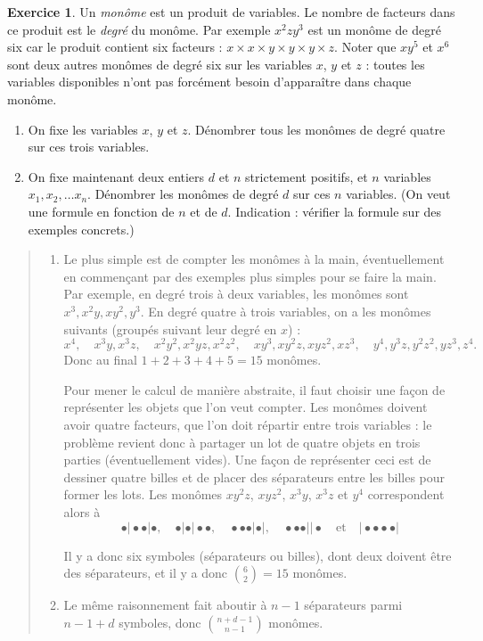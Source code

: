 \documentclass[11pt]{article}
\theoremstyle{definition}
\newtheorem{exo}{Exercice}
\newenvironment{solution}{\begin{quote}\color{teal}}{\end{quote}}
\begin{document}
\begin{exo}
Un \emph{monôme} est un produit de variables. Le nombre de facteurs dans ce produit est le \emph{degré} du monôme.
Par exemple $x^2zy^3$ est un monôme de degré six car le produit contient six facteurs : $x\times x\times y\times y\times y \times z$. Noter que $xy^5$ et $x^6$ sont deux autres monômes de degré six sur les variables $x$, $y$ et $z$ : toutes les variables disponibles n'ont pas forcément besoin d'apparaître dans chaque monôme.
\begin{enumerate}
\item On fixe les variables $x$, $y$ et $z$. Dénombrer tous les monômes de degré quatre sur ces trois variables.
\item On fixe maintenant deux entiers $d$ et $n$ strictement positifs, et $n$ variables $x_1, x_2, \dots x_n$. Dénombrer les monômes de degré $d$ sur ces $n$ variables. (On veut une formule en fonction de $n$ et de $d$. Indication : vérifier la formule sur des exemples concrets.)
\end{enumerate}

\begin{solution}
\begin{enumerate}
\item Le plus simple est de compter les monômes à la main, éventuellement en commençant par des exemples plus simples pour se faire la main. Par exemple, en degré trois à deux variables, les monômes sont $x^3, x^2y, xy^2, y^3$. En degré quatre à trois variables, on a les monômes suivants (groupés suivant leur degré en $x$) :
\[
x^4,\quad x^3y, x^3z, \quad
x^2y^2, x^2yz, x^2z^2,\quad
xy^3, xy^2z,xyz^2,xz^3,\quad
y^4,y^3z,y^2z^2,yz^3,z^4.
\]
Donc au final $1+2+3+4+5=15$ monômes.

Pour mener le calcul de manière abstraite, il faut choisir une façon de représenter les objets que l'on veut compter. Les monômes doivent avoir quatre facteurs, que l'on doit répartir entre trois variables : le problème revient donc à partager un lot de quatre objets en trois parties (éventuellement vides). Une façon de représenter ceci est de dessiner quatre billes et de placer des séparateurs entre les billes pour former les lots. Les monômes $xy^2z$, $xyz^2$, $x^3y$, $x^3z$ et $y^4$ correspondent alors à
\[ \bullet \vert \bullet \bullet \vert \bullet,\quad
\bullet \vert \bullet \vert \bullet \bullet, \quad 
\bullet \bullet \bullet \vert\bullet\vert, \quad 
\bullet \bullet \bullet \vert \vert \bullet \quad\text{et}\quad 
\vert\bullet \bullet \bullet  \bullet \vert 
\]

Il y a donc six symboles (séparateurs ou billes), dont deux doivent être des séparateurs, et il y a donc $\binom{6}{2}=15$ monômes.
\item Le même raisonnement fait aboutir à $n-1$ séparateurs parmi $n-1+d$ symboles, donc $\binom{n+d-1}{n-1}$ monômes.
\end{enumerate}
\end{solution}
\end{exo}
\end{document}
